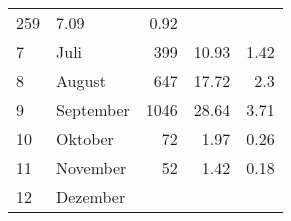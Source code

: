 \begin{longtable}{lXrrr}
       \num{259} &
       \num[round-mode=places,round-precision=2]{7.09} &
         \num[round-mode=places,round-precision=2]{0.92} \\

     7 &
     \multicolumn{1}{X}{ Juli   } &


       \num{399} &
       \num[round-mode=places,round-precision=2]{10.93} &
         \num[round-mode=places,round-precision=2]{1.42} \\

     8 &
     \multicolumn{1}{X}{ August   } &


       \num{647} &
       \num[round-mode=places,round-precision=2]{17.72} &
         \num[round-mode=places,round-precision=2]{2.3} \\

     9 &
     \multicolumn{1}{X}{ September   } &


       \num{1046} &
       \num[round-mode=places,round-precision=2]{28.64} &
         \num[round-mode=places,round-precision=2]{3.71} \\

     10 &
     \multicolumn{1}{X}{ Oktober   } &


       \num{72} &
       \num[round-mode=places,round-precision=2]{1.97} &
         \num[round-mode=places,round-precision=2]{0.26} \\

     11 &
     \multicolumn{1}{X}{ November   } &


       \num{52} &
       \num[round-mode=places,round-precision=2]{1.42} &
         \num[round-mode=places,round-precision=2]{0.18} \\

     12 &
     \multicolumn{1}{X}{ Dezember   } &



\end{longtable}
